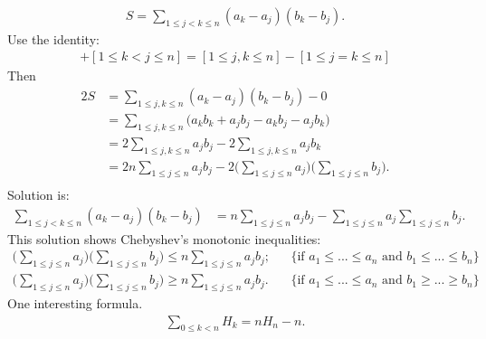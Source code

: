 \documentclass{article}
\begin{document}
\begin{align}
S = \sum_{1\le j < k \le n} {(a_k - a_j)(b_k - b_j)}.
\end{align}
Use the identity:
\begin{align}
[1 \le j < k \le n] + [1 \le k < j \le n] = [1 \le j,k \le n] - [1 \le j = k \le n]
\end{align}
Then
\begin{align}
2S &= \sum_{1\le j , k \le n} {(a_k - a_j)(b_k - b_j)} - 0 \\
   &= \sum_{1\le j , k \le n} {\big(a_k b_k + a_j b_j - a_k b_j - a_j b_k \big)} \\
   &= 2 \sum_{1\le j , k \le n} {a_j b_j} - 2 \sum_{1\le j , k \le n} {a_j b_k} \\
   &= 2n \sum_{1\le j \le n} {a_j b_j} - 2 \big( \sum_{1 \le j \le n} {a_j}\big) \big( \sum_{1 \le j \le n} {b_j} \big).\\
\end{align}
Solution is:
\begin{align}
 \sum_{1\le j < k \le n} {(a_k - a_j)(b_k - b_j)} &= n \sum_{1\le j \le n} {a_j b_j} -  \sum_{1 \le j \le n} {a_j} \sum_{1 \le j \le n} {b_j}.
\end{align}
This solution shows Chebyshev's monotonic inequalities:
\begin{align}
\big( \sum_{1 \le j \le n} {a_j} \big) \big( \sum_{1 \le j \le n} {b_j} \big) \le n \sum_{1\le j \le n} {a_j b_j}; && \{ \text{if } a_1 \le ... \le a_n \text{ and } b_1 \le ... \le b_n \} \\
\big( \sum_{1 \le j \le n} {a_j} \big) \big( \sum_{1 \le j \le n} {b_j} \big) \ge n \sum_{1\le j \le n} {a_j b_j}. && \{ \text{if } a_1 \le ... \le a_n \text{ and } b_1 \ge ... \ge b_n \}
\end{align}
One interesting formula.
\begin{align}
\sum_{0 \le k < n}{H_k} = nH_n - n.
\end{align}
\end{document}
